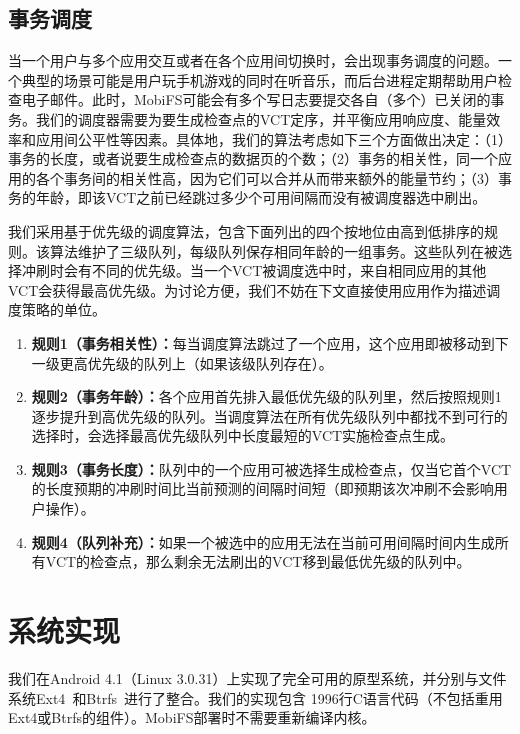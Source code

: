\subsection{事务调度}
\label{subsec:sched}

当一个用户与多个应用交互或者在各个应用间切换时，会出现事务调度的问题。一个典型的场景可能是用户玩手机游戏的同时在听音乐，而后台进程定期帮助用户检查电子邮件。此时，MobiFS可能会有多个写日志要提交各自（多个）已关闭的事务。我们的调度器需要为要生成检查点的VCT定序，并平衡应用响应度、能量效率和应用间公平性等因素。具体地，我们的算法考虑如下三个方面做出决定：（1）事务的长度，或者说要生成检查点的数据页的个数；（2）事务的相关性，同一个应用的各个事务间的相关性高，因为它们可以合并从而带来额外的能量节约；（3）事务的年龄，即该VCT之前已经跳过多少个可用间隔而没有被调度器选中刷出。 
 
我们采用基于优先级的调度算法，包含下面列出的四个按地位由高到低排序的规则。该算法维护了三级队列，每级队列保存相同年龄的一组事务。这些队列在被选择冲刷时会有不同的优先级。当一个VCT被调度选中时，来自相同应用的其他VCT会获得最高优先级。为讨论方便，我们不妨在下文直接使用应用作为描述调度策略的单位。

\begin{enumerate}
\item \textbf{规则1（事务相关性）：}每当调度算法跳过了一个应用，这个应用即被移动到下一级更高优先级的队列上（如果该级队列存在）。

\item \textbf{规则2（事务年龄）：}各个应用首先排入最低优先级的队列里，然后按照规则1逐步提升到高优先级的队列。当调度算法在所有优先级队列中都找不到可行的选择时，会选择最高优先级队列中长度最短的VCT实施检查点生成。

\item \textbf{规则3（事务长度）：}队列中的一个应用可被选择生成检查点，仅当它首个VCT的长度预期的冲刷时间比当前预测的间隔时间短（即预期该次冲刷不会影响用户操作）。

\item \textbf{规则4（队列补充）：}如果一个被选中的应用无法在当前可用间隔时间内生成所有VCT的检查点，那么剩余无法刷出的VCT移到最低优先级的队列中。

\end{enumerate}

\section{系统实现}

我们在Android 4.1（Linux 3.0.31）上实现了完全可用的原型系统，并分别与文件系统Ext4~\cite{Mathur:Ext4:2007}和Btrfs~\cite{Rodeh:2013:BLB:2501620.2501623}进行了整合。我们的实现包含
1996行C语言代码（不包括重用Ext4或Btrfs的组件）。MobiFS部署时不需要重新编译内核。

